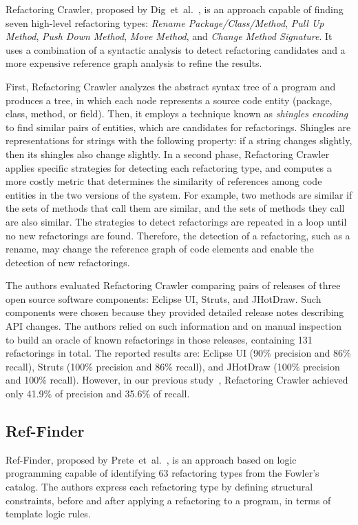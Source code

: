 Refactoring Crawler, proposed by Dig~et~al.~\cite{dig2006automated}, is an approach capable of finding seven high-level refactoring types: \emph{Rename Package/Class/Method}, \emph{Pull Up Method}, \emph{Push Down Method}, \emph{Move Method}, and \emph{Change Method Signature}.
It uses a combination of a syntactic analysis to detect refactoring candidates and a more expensive reference graph analysis to refine the results.

First, Refactoring Crawler analyzes the abstract syntax tree of a program and produces a tree, in which each node represents a source code entity (package, class, method, or field).
Then, it employs a technique known as \emph{shingles encoding} to find 
similar pairs of entities, which are candidates for refactorings.
Shingles are representations for strings with the following property: if a string changes slightly, then its shingles also change slightly.
In a second phase, Refactoring Crawler applies specific strategies for detecting each refactoring type, and computes a more costly metric that determines the similarity of references among code entities in the two versions of the system. For example, two methods are similar if the sets of methods that call them are similar, and the sets of methods they call are also similar.
The strategies to detect refactorings are repeated in a loop until no new refactorings are found. Therefore, the detection of a refactoring, such as a rename, may change the reference graph of code elements and enable the detection of new refactorings.

The authors evaluated Refactoring Crawler comparing pairs of releases of three open source software components: Eclipse UI, Struts, and JHotDraw. Such components were chosen because they provided detailed release notes describing API changes. The authors relied on such information and on manual inspection to build an oracle of known refactorings in those releases, containing 131 refactorings in total.
The reported results are: Eclipse UI (90\% precision and 86\% recall), Struts (100\% precision and 86\% recall), and JHotDraw (100\% precision and 100\% recall).
However, in our previous study~\cite{msr2017}, Refactoring Crawler achieved only 41.9\% of precision and 35.6\% of recall.

\subsection{Ref-Finder}

Ref-Finder, proposed by Prete~et~al.~\cite{prete2010template,Kim:2010:RefFinder}, is an approach based on logic programming capable of identifying 63 refactoring types from the Fowler's catalog\cite{Fowler:1999}.
The authors express each refactoring type by defining structural constraints, before and after applying a refactoring to a program, in terms of template logic rules.

